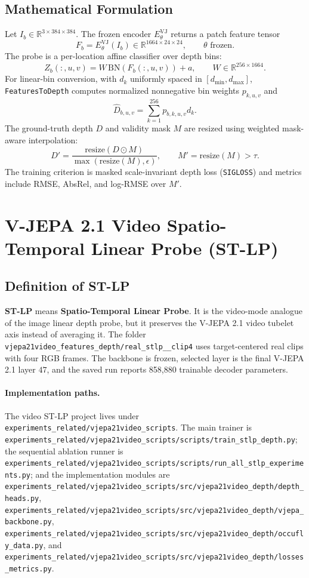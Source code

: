 \documentclass[10pt]{article}
\newcommand{\R}{\mathbb{R}}
\newcommand{\stlp}{ST-LP}
\newcommand{\codepath}[1]{\begingroup\small\nolinkurl{#1}\endgroup}
\begin{document}
\subsection{Mathematical Formulation}
Let \(I_b\in\R^{3\times384\times384}\).  The frozen encoder \(E_{\theta}^{\mathrm{VJ}}\) returns a patch feature tensor
\[
F_b = E_{\theta}^{\mathrm{VJ}}(I_b)\in\R^{1664\times24\times24}, \qquad \theta \text{ frozen}.
\]
The probe is a per-location affine classifier over depth bins:
\[
Z_b(:,u,v)=W\,\mathrm{BN}(F_b(:,u,v))+a,\qquad W\in\R^{256\times1664}.
\]
For linear-bin conversion, with \(d_k\) uniformly spaced in \([d_{\min},d_{\max}]\), \texttt{FeaturesToDepth} computes normalized nonnegative bin weights \(p_{k,u,v}\) and
\[
\hat{D}_{b,u,v}=\sum_{k=1}^{256}p_{b,k,u,v}d_k.
\]
The ground-truth depth \(D\) and validity mask \(M\) are resized using weighted mask-aware interpolation:
\[
D'=\frac{\mathrm{resize}(D\odot M)}{\max(\mathrm{resize}(M),\epsilon)},\qquad
M'=\mathrm{resize}(M)>\tau .
\]
The training criterion is masked scale-invariant depth loss (\texttt{SIGLOSS}) and metrics include RMSE, AbsRel, and log-RMSE over \(M'\).

\section{V-JEPA 2.1 Video Spatio-Temporal Linear Probe (\stlp)}
\subsection{Definition of ST-LP}
\textbf{\stlp} means \textbf{Spatio-Temporal Linear Probe}.  It is the video-mode analogue of the image linear depth probe, but it preserves the V-JEPA 2.1 video tubelet axis instead of averaging it.  The folder \codepath{vjepa21video_features_depth/real_stlp__clip4} uses target-centered real clips with four RGB frames.  The backbone is frozen, selected layer is the final V-JEPA 2.1 layer \(47\), and the saved run reports 858,880 trainable decoder parameters.

\paragraph{Implementation paths.}
The video ST-LP project lives under \codepath{experiments_related/vjepa21video_scripts}.  The main trainer is \codepath{experiments_related/vjepa21video_scripts/scripts/train_stlp_depth.py}; the sequential ablation runner is \codepath{experiments_related/vjepa21video_scripts/scripts/run_all_stlp_experiments.py}; and the implementation modules are \codepath{experiments_related/vjepa21video_scripts/src/vjepa21video_depth/depth_heads.py}, \codepath{experiments_related/vjepa21video_scripts/src/vjepa21video_depth/vjepa_backbone.py}, \codepath{experiments_related/vjepa21video_scripts/src/vjepa21video_depth/occufly_data.py}, and \codepath{experiments_related/vjepa21video_scripts/src/vjepa21video_depth/losses_metrics.py}.
\end{document}
